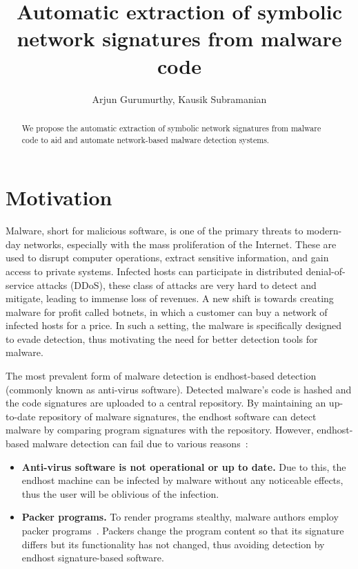 \documentclass[]{article}
\title{Automatic extraction of symbolic network signatures from malware code}
\author{Arjun Gurumurthy, Kausik Subramanian}
\begin{document}
\maketitle

\begin{abstract}
We propose the automatic extraction of symbolic network signatures from malware code to aid and automate network-based malware detection systems.
\end{abstract}

\section{Motivation}
Malware, short for malicious software, 
is one of the primary threats to modern-day networks, especially
with the mass proliferation of the Internet. These are used to 
disrupt computer operations, extract sensitive information, and 
gain access to private systems.  Infected hosts can participate 
in distributed denial-of-service attacks (DDoS), these class of 
attacks are very hard to detect and mitigate, leading to immense
loss of revenues. A new shift is towards creating malware for 
profit called botnets, in which a customer can buy a network of
infected hosts for a price. In such a setting, the malware is
specifically designed to evade detection, thus motivating the need
for better detection tools for malware. 

The most prevalent form of malware detection is endhost-based detection
(commonly known as anti-virus software). Detected malware's code is hashed
and the code signatures are uploaded to a central repository. By maintaining
an up-to-date repository of malware signatures, the endhost software can
detect malware by comparing program signatures with the repository. However, 
endhost-based malware detection can fail due to various reasons~\cite{networksig}:
\begin{itemize}
	\item \textbf{Anti-virus software is not operational or up to date.} 
	Due to this, the endhost machine can be infected by malware without any
	noticeable effects, thus the user will be oblivious of the infection.
	\item \textbf{Packer programs.} To render programs stealthy, malware authors
	employ packer programs~\cite{packer}. Packers change the program content so that
	its signature differs but its functionality has not changed, thus avoiding
	detection by endhost signature-based software.
\end{itemize}
\end{document}

